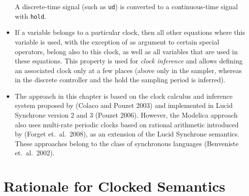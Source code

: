 \begin{itemize}
  A discrete-time signal (such as \lstinline!ud!) is converted to a continuous-time signal with \lstinline!hold!.
\item
  If a variable belongs to a particular clock, then all other
  equations where this variable is used, with the exception of as
  argument to certain special operators, belong also to this clock, as
  well as all variables that are used in these equations. This property
  is used for \emph{clock inference} and allows defining an associated
  clock only at a few places (above only in the sampler, whereas in the
  discrete controller and the hold the sampling period is inferred).
\item
  The approach in this chapter is based on the clock calculus and
  inference system proposed by (Colaco and Pouzet 2003) and implemented
  in Lucid Synchrone version 2 and 3 (Pouzet 2006). However, the
  Modelica approach also uses multi-rate periodic clocks based on
  rational arithmetic introduced by (Forget et.~al.\ 2008), as an
  extension of the Lucid Synchrone semantics. These approaches belong to
  the class of synchronous languages (Benveniste et.~al.\ 2002).
\end{itemize}
\section{Rationale for Clocked Semantics}\label{rationale-for-clocked-semantics}

